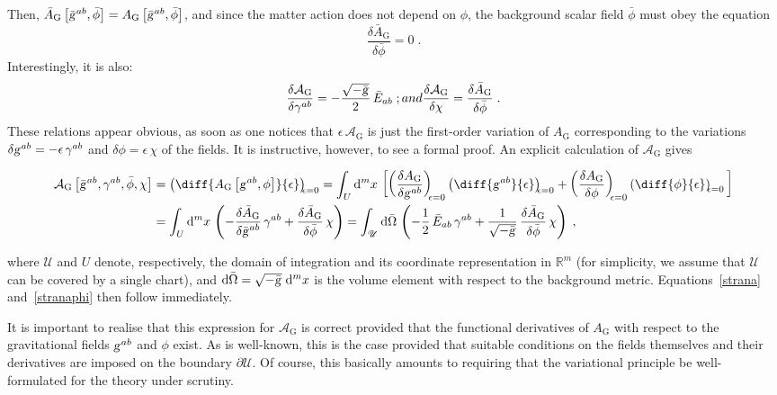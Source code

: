 \documentclass[a4paper,showkeys,aps,prd,reprint,nofootinbib,showpacs,twocolumn]{revtex4-1}
\newcommand{\de}{\mathrm{d}}
\newcommand{\ton}[1]{\left(#1\right)}
\newcommand{\qua}[1]{\left[#1\right]}
\newcommand{\subeq}[1]{\begin{subequations} #1 \end{subequations}}
\newcommand{\eq}[1]{\( #1 \)}
\newcommand{\eqd}[1]{\begin{equation} #1 \end{equation}}
\newcommand{\speq}[1]{\begin{equation}\begin{split}#1\end{split}\end{equation}}
\newcommand{\bol}[1]{\mathbb{#1}}
\newcommand{\Cal}[1]{\mathcal{#1}}
\newcommand{\Scr}[1]{\mathscr{#1}}
\newcommand{\matg}{\text{\textsl{g}}}%
\theoremstyle{plain}
\begin{document}
%
Then, \eq{\bar{A}_{\text{G}} \qua{\bar{\matg}^{ab} , \bar{\phi}} = A_{\text{G}} \qua{\bar{\matg}^{ab} , \bar{\phi}}}, and since the matter action does not depend on \eq{\phi}, the background scalar field \eq{\bar{\phi}} must obey the equation 
%
\eqd{\frac{\delta \bar{A}_{\text{G}}}{\delta\bar{\phi}} = 0 \;. \label{phiback}}
%
Interestingly, it is also:
%
\subeq{\eqd{\frac{\delta \Cal{A}_{\text{G}}}{\delta \gamma^{ab}} = - \frac{\sqrt{-\bar{\matg}}}{2} \, \bar{E}_{ab}\;; \label{strana}}
%
and
%
\eqd{\frac{\delta \Cal{A}_{\text{G}}}{\delta \chi} = \frac{\delta \bar{A}_{\text{G}}}{\delta \bar{\phi}} \;. \label{stranaphi}}}
%
These relations appear obvious, as soon as one notices that \eq{\epsilon \, \Cal{A}_{\text{G}}} is just the first-order variation of \eq{A_{\text{G}}} corresponding to the variations \eq{\delta\matg^{ab} = - \epsilon \, \gamma^{ab}} and \eq{\delta \phi = \epsilon \, \chi} of the fields.  It is instructive, however, to see a formal proof.  An explicit calculation of \eq{\Cal{A}_{\text{G}}} gives
%
\begin{widetext}
%
\speq{\Cal{A}_{\text{G}} \qua{\bar{\matg}^{ab} , \gamma^{ab} , \bar{\phi} , \chi} &=\ton{\diff{A_{\text{G}} \qua{\matg^{ab} , \phi}}{\epsilon}}_{\!\! \epsilon = 0} = \int_{U} \de^m x \, \qua{\ton{\frac{\delta A_{\text{G}}}{\delta \matg^{ab}}}_{\!\! \epsilon = 0} \ton{\diff{\matg^{ab}}{\epsilon}}_{\!\! \epsilon = 0} + \ton{\frac{\delta A_{\text{G}}}{\delta \phi}}_{\!\! \epsilon = 0} \ton{\diff{\phi}{\epsilon}}_{\!\! \epsilon = 0}\,} \\
& =\int_{U} \de^m x\, \ton{- \frac{\delta \bar{A}_{\text{G}}}{\delta \bar{\matg}^{ab}}\,\gamma^{ab} + \frac{\delta \bar{A}_{\text{G}}}{\delta \bar{\phi}} \, \chi} = \int_{\Scr{U}} \de \bar{\Omega} \, \ton{- \frac{1}{2} \, \bar{E}_{ab} \, \gamma^{ab} + \frac{1}{\sqrt{-\bar{\matg}}} \, \frac{\delta \bar{A}_{\text{G}}}{\delta \bar{\phi}} \, \chi} \;, \label{ponzipo}}
%
\end{widetext}
%
where \eq{\Scr{U}} and \eq{U} denote, respectively, the domain of integration and its coordinate representation in \eq{\bol{R}^m} (for simplicity, we assume that \eq{\Scr{U}} can be covered by a single chart), and \eq{\de \bar{\Omega} = \sqrt{-\bar{\matg}} \; \de^m x} is the volume element with respect to the background metric. Equations~\eqref{strana} and~\eqref{stranaphi} then follow immediately.

It is important to realise that this expression for \eq{\Cal{A}_{\text{G}}} is correct provided that the functional derivatives of \eq{A_{\text{G}}} with respect to the gravitational fields \eq{\matg^{ab}} and \eq{\phi} exist.   As is well-known, this is the case provided that suitable conditions on the fields themselves and their derivatives are imposed on the boundary \eq{\partial \Scr{U}}.  Of course, this basically amounts to requiring that the variational principle be well-formulated for the theory under scrutiny.  
\end{document}
